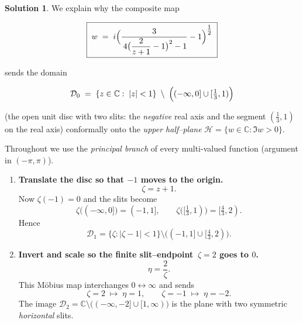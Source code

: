 \documentclass[12pt]{article}
\theoremstyle{definition} %
\newtheorem{solution}{Solution}
\theoremstyle{plain} %
\begin{document}
        \begin{solution}
          We explain why the composite map  
          
          \[
          \boxed{\;
             w
             \;=\;
             i\Bigl(
                  \frac{3}{\,4\bigl(\dfrac{2}{z+1}-1\bigr)^{2}-1}-1
                \Bigr)^{\tfrac12}
           \;}
          \]
          
          sends the domain  
          
          \[
          \mathcal D_0
            \;=\;
            \{z\in\mathbb{C}:\;|z|<1\}
            \;\setminus\;
            \Bigl(
               (-\infty,0]\cup [\tfrac13,1)
            \Bigr)
          \]
          
          (the open unit disc with two slits: the
          \emph{negative} real axis and the segment $(\tfrac13,1)$ on the real
          axis) conformally onto the \emph{upper half–plane}
          $\displaystyle\mathcal H=\{w\in\mathbb{C}:\Im w>0\}$.
          
          Throughout we use the \emph{principal branch}
          of every multi-valued function (argument in $(-\pi,\pi)$).
          
          \medskip
          \begin{enumerate}[label=\textbf{Step \arabic*:}, itemsep=1.4ex]
          
          \item  \textbf{Translate the disc so that $-1$ moves to the origin.}
          \[
          \zeta = z+1.
          \]
          Now $\zeta( -1)=0$ and the slits become
          \[
          \zeta\bigl((-\infty,0]\bigr)=(-1,1],
          \qquad
          \zeta\bigl([\tfrac13,1)\bigr)=[\tfrac43,2).
          \]
          Hence
          \[
          \mathcal D_1
            = \bigl\{\zeta:|\zeta-1|<1\bigr\}
              \setminus\bigl(( -1,1]\cup [\tfrac43,2)\bigr).
          \]
          
          \item  \textbf{Invert and scale so the finite slit–endpoint $\,\zeta=2$ goes to $0$.}
          \[
          \eta=\frac{2}{\zeta}.
          \]
          This Möbius map interchanges $0\leftrightarrow\infty$ and sends
          \[
          \zeta=2\;\longmapsto\;\eta=1,
          \qquad
          \zeta=-1\;\longmapsto\;\eta=-2.
          \]
          The image
          \(
             \mathcal D_2
             =\mathbb{C}\setminus\bigl(( -\infty,-2]\cup [1,\infty)\bigr)
          \)
          is the plane with two symmetric \emph{horizontal} slits.
          

\end{enumerate}
\end{solution}
\end{document}
